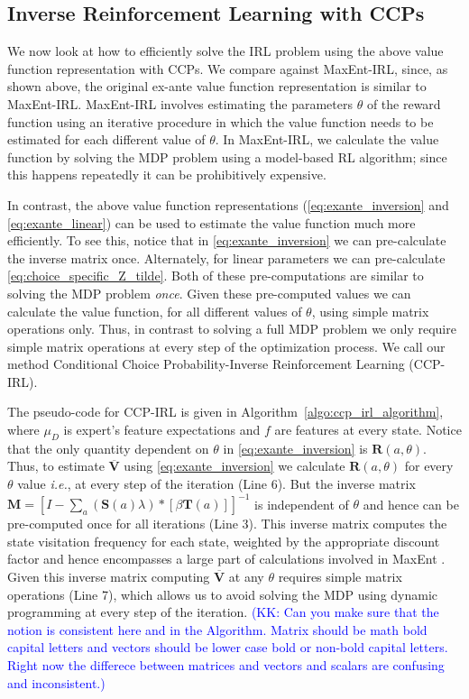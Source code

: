 \documentclass{article}
\begin{document}
\subsection{Inverse Reinforcement Learning with CCPs}
We now look at how to efficiently solve the IRL problem using the above value function representation with CCPs. 
We compare against MaxEnt-IRL, since, as shown above, the original ex-ante value function representation is similar to MaxEnt-IRL.
MaxEnt-IRL involves estimating the parameters $\theta$ of the reward function using an iterative procedure in which the value function needs to be estimated for each different value of $\theta$.
In MaxEnt-IRL, we calculate the value function by solving the MDP problem using a model-based RL algorithm; since this happens repeatedly it can be prohibitively expensive.

In contrast, the above value function representations (\eqref{eq:exante_inversion} and \eqref{eq:exante_linear}) can be used to estimate the value function much more efficiently. To see this, notice that in \eqref{eq:exante_inversion} we can pre-calculate the inverse matrix once. Alternately, for linear parameters we can pre-calculate \eqref{eq:choice_specific_Z_tilde}. Both of these pre-computations are similar to solving the MDP problem \textit{once}. Given these pre-computed values we can calculate the value function, for all different values of $\theta$, using simple matrix operations only. Thus, in contrast to solving a full MDP problem we only require simple matrix operations at every step of the optimization process. We call our method Conditional Choice Probability-Inverse Reinforcement Learning (CCP-IRL).

The pseudo-code for CCP-IRL is given in Algorithm~\ref{algo:ccp_irl_algorithm}, where $\mu_D$ is expert's feature expectations and $f$ are features at every state.
Notice that the only quantity dependent on $\theta$ in \eqref{eq:exante_inversion} is $\mathbf{R}(a, \theta)$.
Thus, to estimate $\mathbf{\overline{V}}$ using \eqref{eq:exante_inversion} we calculate $\mathbf{R}(a, \theta)$ for every $\theta$ value \emph{i.e.}, at every step of the iteration (Line 6).
But the inverse matrix $\mathbf{M}=\left[I-\sum_{a}(\mathbf{S}(a) \lambda) *\left[ \beta \mathbf{T}(a)  \right]\right]^{-1}$ is independent of $\theta$ and hence can be pre-computed once for all iterations (Line 3).
This inverse matrix computes the state visitation frequency for each state, weighted by the appropriate discount factor and hence encompasses a large part of calculations involved in MaxEnt \cite{ziebart_phd}.
Given this inverse matrix computing $\mathbf{\overline{V}}$ at any $\theta$ requires simple matrix operations (Line 7), which allows us to avoid solving the MDP using dynamic programming at every step of the iteration. \textcolor{blue}{(KK: Can you make sure that the notion is consistent here and in the Algorithm. Matrix should be math bold capital letters and vectors should be lower case bold or non-bold capital letters. Right now the differece between matrices and vectors and scalars are confusing and inconsistent.)}
\end{document}
